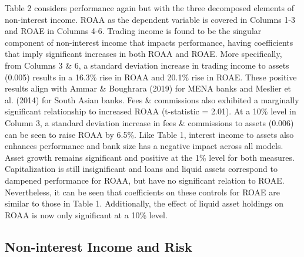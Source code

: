 \documentclass[10pt]{article} %
\begin{document}
Table 2 considers performance again but with the three decomposed elements of non-interest income. ROAA as the dependent variable is covered in Columns 1-3 and ROAE in Columns 4-6. Trading income is found to be the singular component of non-interest income that impacts performance, having coefficients that imply significant increases in both ROAA and ROAE. More specifically, from Columns 3 \& 6, a standard deviation increase in trading income to assets (0.005) results in a 16.3\% rise in ROAA and 20.1\% rise in ROAE. These positive results align with Ammar \& Boughrara (2019) for MENA banks and Meslier et al. (2014) for South Asian banks. Fees \& commissions also exhibited a marginally significant relationship to increased ROAA (t-statistic = 2.01). At a 10\% level in Column 3, a standard deviation increase in fees \& commissions to assets (0.006) can be seen to raise ROAA by 6.5\%. Like Table 1, interest income to assets also enhances performance and bank size has a negative impact across all models. Asset growth remains significant and positive at the 1\% level for both measures. Capitalization is still insignificant and loans and liquid assets correspond to dampened performance for ROAA, but have no significant relation to ROAE. Nevertheless, it can be seen that coefficients on these controls for ROAE are similar to those in Table 1. Additionally, the effect of liquid asset holdings on ROAA is now only significant at a 10\% level.

\subsection{Non-interest Income and Risk}
\end{document}
